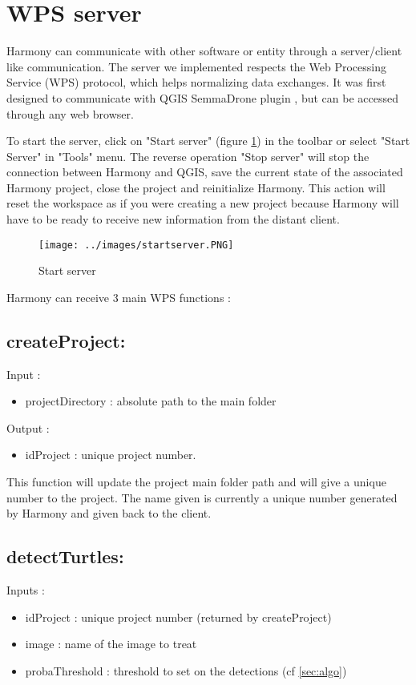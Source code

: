 \documentclass{article}
\begin{document}
\section{WPS server}
Harmony can communicate with other software or entity through a server/client like communication. The server we 
implemented respects the Web Processing Service (WPS) protocol, which helps normalizing data exchanges. It was first designed to communicate with QGIS SemmaDrone plugin , but can be accessed through any web browser.

To start the server, click on "Start server" (figure \ref{fig:startServer}) in the toolbar or select "Start Server" in "Tools" menu. The reverse operation "Stop server" will stop the connection between Harmony and QGIS, save the current state of the associated Harmony project, close the project and reinitialize Harmony. This action will reset the workspace as if you were creating a new project because Harmony will have to be ready to receive new information from the distant client.

\begin{figure}[!h]
  \centering
  \texttt{[image: ../images/startserver.PNG]} 
  \caption{\label{fig:startServer} Start server}
\end{figure}

  Harmony can receive 3 main WPS functions : 
 \subsection{createProject:}
 Input : 
 \begin{itemize}
 \item projectDirectory : absolute path to the main folder
 \end{itemize}
 Output : 
 \begin{itemize}
 \item idProject : unique project number. 
 \end{itemize}
 This function will update the project main folder path and will give a unique number to the project. The name given is currently a unique number generated by Harmony and given back to the client.
 \subsection{detectTurtles:} 
	Inputs :
  \begin{itemize}
    \item idProject :  unique project number (returned by createProject)
    \item image : name of the image to treat
    \item probaThreshold : threshold to set on the detections (cf \ref{sec:algo})
  \end{itemize}
\end{document}
